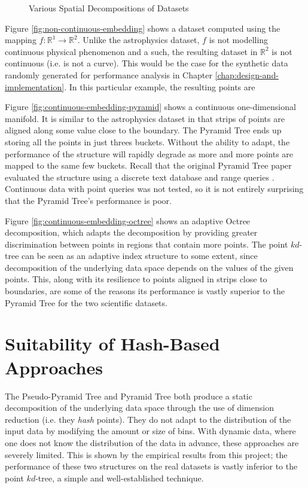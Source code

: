 \begin{figure}
	\caption{Various Spatial Decompositions of Datasets}
	\label{fig:static-adaptive-decomposition}
\end{figure}

Figure \ref{fig:non-continuous-embedding} shows a dataset computed using the mapping $f : \mathbb{R}^1 \rightarrow \mathbb{R}^2$. Unlike the astrophysics dataset, $f$ is not modelling continuous physical phenomenon and a such, the resulting dataset in $\mathbb{R}^2$ is not continuous (i.e. is not a curve). This would be the case for the synthetic data randomly generated for performance analysis in Chapter \ref{chap:design-and-implementation}. In this particular example, the resulting points are  

Figure \ref{fig:continuous-embedding-pyramid} shows a continuous one-dimensional manifold. It is similar to the astrophysics dataset in that strips of points are aligned along some value close to the boundary. The Pyramid Tree ends up storing all the points in just threes buckets. Without the ability to adapt, the performance of the structure will rapidly degrade as more and more points are mapped to the same few buckets. Recall that the original Pyramid Tree paper evaluated the structure using a discrete text database and range queries \cite{pyramid-tree}. Continuous data with point queries was not tested, so it is not entirely surprising that the Pyramid Tree's performance is poor.

Figure \ref{fig:continuous-embedding-octree} shows an adaptive Octree decomposition, which adapts the decomposition by providing greater discrimination between points in regions that contain more points. The point $kd$-tree can be seen as an adaptive index structure to some extent, since decomposition of the underlying data space depends on the values of the given points. This, along with its resilience to points aligned in strips close to boundaries, are some of the reasons its performance is vastly superior to the Pyramid Tree for the two scientific datasets.

\section{Suitability of Hash-Based Approaches}

The Pseudo-Pyramid Tree and Pyramid Tree both produce a static decomposition of the underlying data space through the use of dimension reduction (i.e. they \textit{hash} points). They do not adapt to the distribution of the input data by modifying the amount or size of bins. With dynamic data, where one does not know the distribution of the data in advance, these approaches are severely limited. This is shown by the empirical results from this project; the performance of these two structures on the real datasets is vastly inferior to the point $kd$-tree, a simple and well-established technique.

